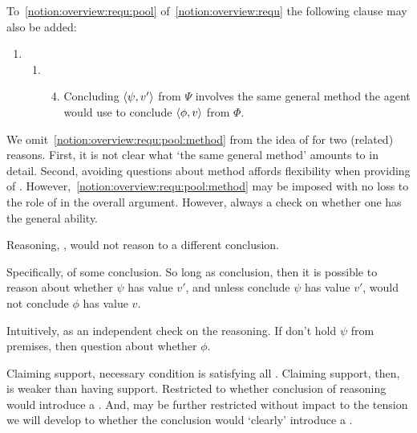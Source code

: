 \begin{note}
  To~\ref{notion:overview:requ:pool} of~\autoref{notion:overview:requ} the following clause may also be added:
  \begin{enumerate}[label=]
  \item
    \begin{enumerate}[label=]
    \item
      \begin{enumerate}[label=\roman*., ref=(\roman*), resume*=csIdeaCounter]
        \setcounter{enumiii}{3}
      \item
        \label{notion:overview:requ:pool:method}
        Concluding \(\langle \psi, v' \rangle\) from \(\Psi\) involves the same general method the agent would use to conclude \(\langle \phi, v \rangle\) from \(\Phi\).
      \end{enumerate}
    \end{enumerate}
  \end{enumerate}
  We omit~\autoref{notion:overview:requ:pool:method} from the idea of \csN{} for two (related) reasons.
  First, it is not clear what `the same general method' amounts to in detail.
  Second, avoiding questions about method affords flexibility when providing  of \zS{}.
  However,~\autoref{notion:overview:requ:pool:method} may be imposed with no loss to the role of \zS{} in the overall argument.
  However, always a check on whether one has the general ability.
\end{note}

\begin{note}
  Reasoning, \support{}, would not reason to a different conclusion.

  Specifically, \requ{} of some conclusion.
  So long as conclusion, then it is possible to reason about whether \(\psi\) has value \(v'\), and unless conclude \(\psi\) has value \(v'\), would not conclude \(\phi\) has value \(v\).

  Intuitively, \requ{} as an independent check on the reasoning.
  If don't hold \(\psi\) from premises, then question about whether \(\phi\).

  Claiming support, necessary condition is satisfying all .
  Claiming support, then, is weaker than having support.
  Restricted to whether conclusion of reasoning would introduce a \requ{}.
  And, may be further restricted without impact to the tension we will develop to whether the conclusion would `clearly' introduce a \requ{}.
\end{note}

